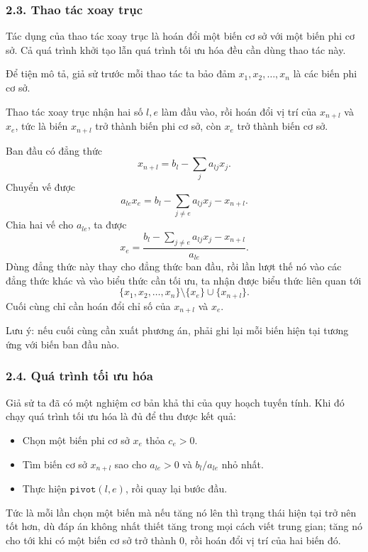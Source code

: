 \documentclass[11pt]{article}
\begin{document}
\subsubsection*{2.3. Thao tác xoay trục}

Tác dụng của thao tác xoay trục là hoán đổi một biến cơ sở với một biến phi
cơ sở. Cả quá trình khởi tạo lẫn quá trình tối ưu hóa đều cần dùng thao tác
này.

Để tiện mô tả, giả sử trước mỗi thao tác ta bảo đảm
\(x_1,x_2,\ldots,x_n\) là các biến phi cơ sở.

Thao tác xoay trục nhận hai số \(l,e\) làm đầu vào, rồi hoán đổi vị trí của
\(x_{n+l}\) và \(x_e\), tức là biến \(x_{n+l}\) trở thành biến phi cơ sở, còn
\(x_e\) trở thành biến cơ sở.

Ban đầu có đẳng thức
\[
  x_{n+l}=b_l-\sum_j a_{lj}x_j.
\]
Chuyển vế được
\[
  a_{le}x_e=b_l-\sum_{j\ne e}a_{lj}x_j-x_{n+l}.
\]
Chia hai vế cho \(a_{le}\), ta được
\[
  x_e=\frac{b_l-\sum_{j\ne e}a_{lj}x_j-x_{n+l}}{a_{le}}.
\]
Dùng đẳng thức này thay cho đẳng thức ban đầu, rồi lần lượt thế nó vào các
đẳng thức khác và vào biểu thức cần tối ưu, ta nhận được biểu thức liên quan
tới
\[
  \{x_1,x_2,\ldots,x_n\}\setminus\{x_e\}\cup\{x_{n+l}\}.
\]
Cuối cùng chỉ cần hoán đổi chỉ số của \(x_{n+l}\) và \(x_e\).

Lưu ý: nếu cuối cùng cần xuất phương án, phải ghi lại mỗi biến hiện tại tương
ứng với biến ban đầu nào.

\subsubsection*{2.4. Quá trình tối ưu hóa}

Giả sử ta đã có một nghiệm cơ bản khả thi của quy hoạch tuyến tính. Khi đó
chạy quá trình tối ưu hóa là đủ để thu được kết quả:
\begin{itemize}
  \item Chọn một biến phi cơ sở \(x_e\) thỏa \(c_e>0\).
  \item Tìm biến cơ sở \(x_{n+l}\) sao cho \(a_{le}>0\) và \(b_l/a_{le}\) nhỏ
  nhất.
  \item Thực hiện \(\texttt{pivot}(l,e)\), rồi quay lại bước đầu.
\end{itemize}

Tức là mỗi lần chọn một biến mà nếu tăng nó lên thì trạng thái hiện tại trở
nên tốt hơn, dù đáp án không nhất thiết tăng trong mọi cách viết trung gian;
tăng nó cho tới khi có một biến cơ sở trở thành \(0\), rồi hoán đổi vị trí của
hai biến đó.
\end{document}
